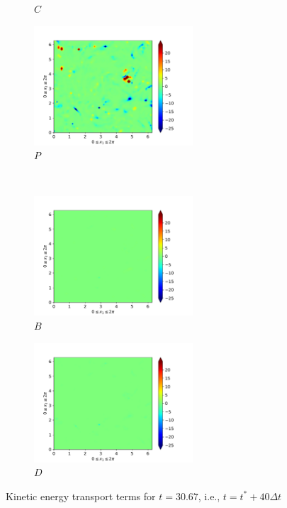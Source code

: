 \begin{figure}[H]
\begin{subfigure}{0.45\textwidth}
        \caption{$C$}
    \end{subfigure}
    \newline
    \begin{subfigure}{0.45\textwidth}
        \includegraphics[height=1.75in]{media/run-cds-65/P-ke-1380}
        \caption{$P$}
    \end{subfigure}
    ~
    \begin{subfigure}{0.45\textwidth}
        \includegraphics[height=1.75in]{media/run-cds-65/B-ke-1380}
        \caption{$B$}
    \end{subfigure}
    \newline
    \begin{subfigure}{0.45\textwidth}
        \includegraphics[height=1.75in]{media/run-cds-65/D-ke-1380}
        \caption{$D$}
    \end{subfigure}
    \caption{Kinetic energy transport terms for $t=30.67$, i.e., $t=t^{\ast} + 40 \Delta t$}
\end{figure}
